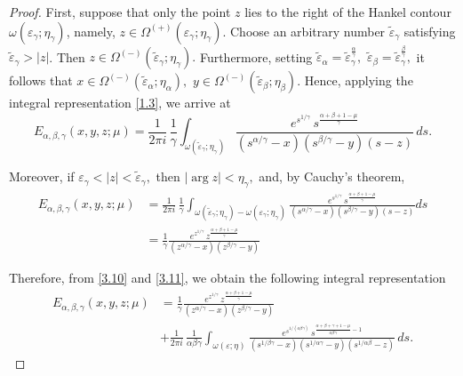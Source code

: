 \documentclass[10pt,a4paper]{amsart}
\begin{document}
\begin{proof}
   First, suppose that only the point $z$ lies to the right of the Hankel contour
$\omega(\varepsilon_\gamma;\eta_\gamma)$, namely,
$
z\in\Omega^{(+)}(\varepsilon_\gamma;\eta_\gamma).
$
Choose an arbitrary number $\widetilde{\varepsilon}_{\gamma}$ satisfying
$\widetilde{\varepsilon}_{\gamma}>|z|$. Then
$
z\in\Omega^{(-)}(\widetilde{\varepsilon}_{\gamma};\eta_\gamma).
$
Furthermore, setting
$
\widetilde{\varepsilon}_{\alpha}
=\widetilde{\varepsilon}_{\gamma}^{\frac{\alpha}{\gamma}},
\,\,
\widetilde{\varepsilon}_{\beta}
=\widetilde{\varepsilon}_{\gamma}^{\frac{\beta}{\gamma}},
$
it follows that
$
x\in\Omega^{(-)}(\widetilde{\varepsilon}_{\alpha};\eta_\alpha),
\,\,
y\in\Omega^{(-)}(\widetilde{\varepsilon}_{\beta};\eta_\beta).
$
Hence, applying the integral representation \eqref{1.3}, we arrive at
\begin{equation}\label{3.10}E_{\alpha,\beta,\gamma}(x,y,z;\mu)
=
\frac{1}{2\pi i}\,
\frac{1}{\gamma}
\int_{\omega(\widetilde{\varepsilon}_{\gamma};\eta_\gamma)}
\frac{
e^{s^{1/\gamma}}
\,s^{\frac{\alpha+\beta+1-\mu}{\gamma}}
}
{
(s^{\alpha/\gamma}-x)(s^{\beta/\gamma}-y)(s-z)
}
\,ds.\end{equation}

Moreover, if
$
\varepsilon_\gamma<|z|<\widetilde{\varepsilon}_{\gamma},
$
then
$
|\arg z|<\eta_\gamma,
$
and, by Cauchy's theorem,
\begin{equation}\label{3.11}\begin{aligned}
E_{\alpha,\beta,\gamma}(x,y,z;\mu)
&=
\frac{1}{2\pi i}\,
\frac{1}{\gamma}
\int_{\omega(\widetilde{\varepsilon}_{\gamma};\eta_\gamma)
-
\omega(\varepsilon_\gamma;\eta_\gamma)}
\frac{
e^{s^{1/\gamma}}
\,s^{\frac{\alpha+\beta+1-\mu}{\gamma}}
}
{
(s^{\alpha/\gamma}-x)(s^{\beta/\gamma}-y)(s-z)
}ds\\
&=\frac{1}{\gamma}
\frac{
e^{z^{1/\gamma}}
\,z^{\frac{\alpha+\beta+1-\mu}{\gamma}}}
{(z^{\alpha/\gamma}-x)(z^{\beta/\gamma}-y)}\end{aligned}
\end{equation}

Therefore, from \eqref{3.10} and \eqref{3.11}, we obtain the following integral representation 
\begin{equation}\label{3.12}\begin{aligned}
E_{\alpha,\beta,\gamma}(x,y,z;\mu)
&=\frac{1}{\gamma}\frac{
e^{z^{1/\gamma}}
\,z^{\frac{\alpha+\beta+1-\mu}{\gamma}}}
{(z^{\alpha/\gamma}-x)(z^{\beta/\gamma}-y)}\\
&+
\frac{1}{2\pi i}\,
\frac{1}{\alpha\beta\gamma}
\int_{\omega(\varepsilon;\eta)}
\frac{
e^{s^{1/(\alpha\beta\gamma)}}
\,s^{\frac{\alpha+\beta+\gamma+1-\mu}{\alpha\beta\gamma}-1}
}
{
(s^{1/\beta\gamma}-x)(s^{1/\alpha\gamma}-y)(s^{1/\alpha\beta}-z)
}
\,ds.\end{aligned}\end{equation}


\end{proof}
\end{document}
